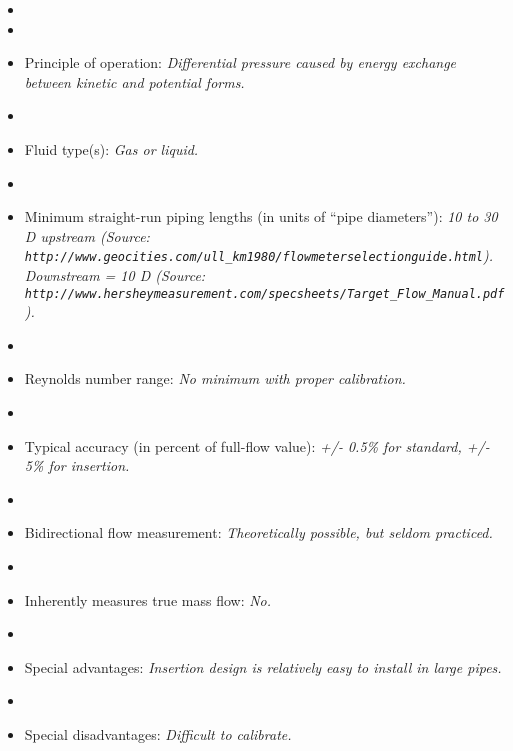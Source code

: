 \begin{itemize}
\goodbreak
\item{} 
\vskip 5pt
\item\item{} Principle of operation: {\it Differential pressure caused by energy exchange between kinetic and potential forms.}
\vskip 5pt
\item\item{} Fluid type(s): {\it Gas or liquid.}
\vskip 5pt
\item\item{} Minimum straight-run piping lengths (in units of ``pipe diameters''): {\it 10 to 30 D upstream (Source: {\tt http://www.geocities.com/ull\_km1980/flowmeterselectionguide.html}).  Downstream = 10 D (Source: {\tt http://www.hersheymeasurement.com/specsheets/Target\_Flow\_Manual.pdf}).}
\vskip 5pt
\item\item{} Reynolds number range: {\it No minimum with proper calibration.}
\vskip 5pt
\item\item{} Typical accuracy (in percent of full-flow value): {\it +/- 0.5\% for standard, +/- 5\% for insertion.}
\vskip 5pt
\item\item{} Bidirectional flow measurement: {\it Theoretically possible, but seldom practiced.}
\vskip 5pt
\item\item{} Inherently measures true mass flow: {\it No.}
\vskip 5pt
\item\item{} Special advantages: {\it Insertion design is relatively easy to install in large pipes.}
\vskip 5pt
\item\item{} Special disadvantages: {\it Difficult to calibrate.}
\end{itemize}

